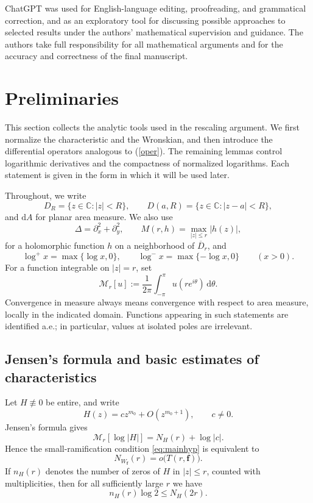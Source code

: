 \documentclass[12pt,letterpaper,reqno]{amsart}
\theoremstyle{definition}
\numberwithin{equation}{section}
\newcommand{\C}{\mathbb C}
\newcommand{\NN}{N}
\newcommand{\mean}[2]{\mathcal M_{#1}\!\left[#2\right]}
\newcommand{\fv}{\bm f}
\begin{document}
ChatGPT was used for English-language editing, proofreading, and grammatical
correction, and as an exploratory tool for discussing possible approaches to
selected results under the authors' mathematical supervision and guidance.
The authors take full responsibility for all mathematical arguments and for
the accuracy and correctness of the final manuscript.


\section{Preliminaries}\label{sec:analytic}

This section collects the analytic tools used in the rescaling argument. We
first normalize the characteristic and the Wronskian, and then introduce the
differential operators analogous to (\ref{oper}).  The remaining lemmas control
logarithmic derivatives and the compactness of normalized logarithms. Each
statement is given in the form in which it will be used later.

Throughout, we write
\[
D_R=\{z\in\C:|z|<R\},\qquad
D(a,R)=\{z\in\C:|z-a|<R\},
\]
and \(\mathrm dA\) for planar area measure. We also use
\[
\Delta=\partial_x^2+\partial_y^2,\qquad
M(r,h)=\max_{|z|\le r}|h(z)|,
\]
for a holomorphic function \(h\) on a neighborhood of \(\overline D_r\), and
\[
\log^+x=\max\{\log x,0\},\qquad
\log^-x=\max\{-\log x,0\}\qquad(x>0).
\]
For a function integrable on \(|z|=r\), set
\[
\mean r u:=\frac1{2\pi}\int_{-\pi}^{\pi}u(re^{i\theta})\,\mathrm d\theta.
\]
Convergence in measure always means convergence with respect to area measure,
locally in the indicated domain. Functions appearing in such statements are
identified a.e.; in particular, values at isolated poles are irrelevant.


\subsection{Jensen's formula and basic estimates of characteristics}

Let \(H\not\equiv0\) be entire, and write
\[
H(z)=cz^{m_0}+O(z^{m_0+1}),\qquad c\ne0.
\]
Jensen's formula gives
\begin{equation}\label{eq:zerojensen}
 \mean r{\log|H|}=\NN_H(r)+\log|c|.
\end{equation}
Hence the small-ramification condition
\eqref{eq:mainhyp} is equivalent to
\[
\NN_{W_{\fv}}(r)=o\bigl(T(r,\fv)\bigr).
\]
If $n_H(r)$ denotes the number of zeros of $H$ in $|z|\leq r$, counted
with multiplicities, then for all sufficiently large \(r\) we have
\begin{equation}\label{eq:countbound}
 n_H(r)\log2\leq \NN_H(2r).
\end{equation}
\end{document}
